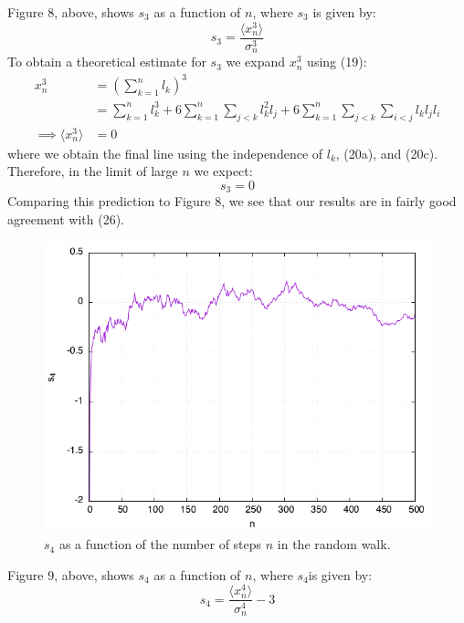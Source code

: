 \documentclass[12pt,letterpaper]{article}
\begin{document}
Figure 8, above, shows $s_3$ as a function of $n$, where $s_3$ is given by:
\begin{equation}
	s_3 = \frac{\langle x_n^3 \rangle}{\sigma_n^3}
\end{equation}
To obtain a theoretical estimate for $s_3$ we expand $x_n^3$ using (19):
\begin{align}
	x_n^3 &= \left( \sum\limits_{k=1}^{n} l_{k} \right)^3 \nonumber \\
		  &= \sum\limits_{k=1}^{n} l_k^3 + 6\sum\limits_{k=1}^{n}\sum\limits_{j<k} l_k^2 l_j + 6\sum\limits_{k=1}^{n}\sum\limits_{j<k}\sum\limits_{i<j} l_k l_j l_i \nonumber \\
	\implies \langle x_n^3 \rangle &=0
\end{align}
where we obtain the final line using the independence of $l_k$, (20a), and (20c). Therefore, in the limit of large $n$ we expect:
\begin{equation}
	s_3 = 0
\end{equation}
Comparing this prediction to Figure 8, we see that our results are in fairly good agreement with (26).

\begin{figure}[H]
	\centering
	\includegraphics[scale=0.6]{s_4.png}
	\caption{$s_4$ as a function of the number of steps $n$ in the random walk.}
\end{figure}

Figure 9, above, shows $s_4$ as a function of $n$, where $s_4$is given by:
\begin{equation}
s_4 = \frac{\langle x_n^4\rangle}{\sigma_n^4} -3
\end{equation}
\end{document}
